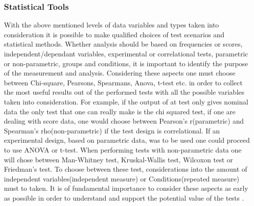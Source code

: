 \subsubsection{Statistical Tools}
With the above mentioned levels of data variables and types taken into consideration it is possible to make qualified choices of test scenarios and statistical methods. Whether analysis should be based on frequencies or scores, independent/dependant variables, experimental or correlational tests, parametric or non-parametric, groups and conditions, it is important to identify the purpose of the measurement and analysis. Considering these aspects one must choose between Chi-square, Pearsons, Spearmans, Anova, t-test etc. in order to collect the most useful results out of the performed tests with all the possible variables taken into consideration. For example, if the output of at test only gives nominal data the only test that one can really make is the chi squared test, if one are dealing with score data, one would choose between Pearson’s r(parametric) and Spearman’s rho(non-parametric) if the test design is correlational. If an experimental design, based on parametric data, was to be used one could proceed to use ANOVA or t-test. When performing tests with non-parametric data one will chose between Man-Whitney test, Kruskal-Wallis test, Wilcoxon test or Friedman's test. To choose between these test, considerations into the amount of independent variables(independent measure) or Conditions(repeated measure) must to taken. It is of fundamental importance to consider these aspects as early as possible in order to understand and support the potential value of the tests \citep[page 274]{Design}.

